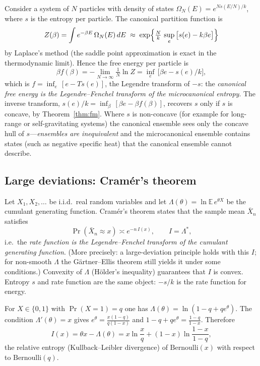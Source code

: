 Consider a system of $N$ particles with density of states
$\Omega_N(E)=e^{N s(E/N)/k}$, where $s$ is the entropy per particle.  The
canonical partition function is
\[
  Z(\beta)=\int e^{-\beta E}\,\Omega_N(E)\,d E
  \;\approx\;\exp\Bigl\{\tfrac Nk\,\sup_e\,\bigl[s(e)-k\beta e\bigr]\Bigr\}
\]
by Laplace's method (the saddle point approximation is exact in the
thermodynamic limit).  Hence the free energy per particle is
\[
  \beta f(\beta)=-\lim_{N\to\infty}\tfrac1N\ln Z
  =\inf_e\,\bigl[\beta e-s(e)/k\bigr],
\]
which is $f=\inf_e\,[e-Ts(e)]$, the Legendre transform of $-s$:
the \emph{canonical free energy is the Legendre--Fenchel transform of the
microcanonical entropy}.  The inverse transform,
$s(e)/k=\inf_\beta\,[\beta e-\beta f(\beta)]$, recovers $s$ only if $s$ is
concave, by Theorem~\ref{thm:fm}.  Where $s$ is non-concave (for example
for long-range or self-gravitating systems) the canonical ensemble sees only
the concave hull of $s$---\emph{ensembles are inequivalent} and the
microcanonical ensemble contains states (such as negative specific heat) that
the canonical ensemble cannot describe.

\subsection{Large deviations: Cram\'er's theorem}

Let $X_1,X_2,\dots$ be i.i.d.\ real random variables and let
$\Lambda(\theta)=\ln\mathbb{E}\,e^{\theta X}$ be the cumulant generating function.
Cram\'er's theorem states that the sample mean $\bar X_n$ satisfies
\[
  \Pr(\bar X_n\approx x)\asymp e^{-n\,I(x)},\qquad I=\Lambda^*,
\]
i.e.\ the \emph{rate function is the Legendre--Fenchel transform of the cumulant
generating function}.  (More precisely: a large-deviation principle holds
with this $I$; for non-smooth $\Lambda$ the G\"artner--Ellis theorem still
yields it under some conditions.)  Convexity of $\Lambda$ (H\"older's
inequality) guarantees that $I$ is convex.  Entropy $s$ and rate function are
the same object: $-s/k$ is the rate function for energy.

\begin{example}
For $X\in\{0,1\}$ with $\Pr(X=1)=q$ one has $\Lambda(\theta)=\ln(1-q+qe^\theta)$.
The condition $\Lambda'(\theta)=x$ gives $e^\theta=\frac{x(1-q)}{q(1-x)}$ and
$1-q+qe^\theta=\frac{1-q}{1-x}$.  Therefore
\[
  I(x)=\theta x-\Lambda(\theta)=x\ln\frac xq+(1-x)\ln\frac{1-x}{1-q},
\]
the relative entropy (Kullback--Leibler divergence) of $\mathrm{Bernoulli}(x)$
with respect to $\mathrm{Bernoulli}(q)$.
\end{example}

